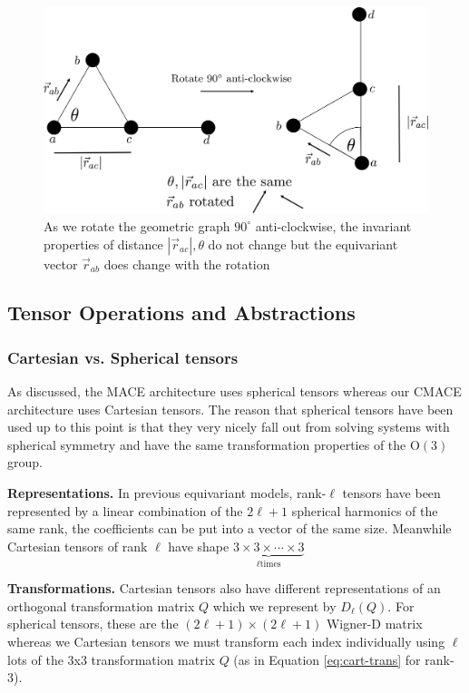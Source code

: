 \begin{figure}[H]
    \centering
    \includegraphics[scale=0.1]{figures/equivariance.png}
    \caption{As we rotate the geometric graph $90^\circ$ anti-clockwise, the invariant properties of distance $|\vec r_{ac}|, \theta$ do not change but the equivariant vector $\vec r_{ab}$ does change with the rotation}
    \label{fig:equivariance}
\end{figure}


\subsection{Tensor Operations and Abstractions}

\subsubsection{Cartesian vs. Spherical tensors} 

As discussed, the MACE architecture uses spherical tensors whereas our CMACE architecture uses Cartesian tensors. The reason that spherical tensors have been used up to this point is that they very nicely fall out from solving systems with spherical symmetry and have the same transformation properties of the $\mathrm O (3)$ group.

\textbf{Representations. } In previous equivariant models, rank-$\ell$ tensors have been represented by a linear combination of the $2\ell + 1$ spherical harmonics of the same rank, the coefficients can be put into a vector of the same size. Meanwhile Cartesian tensors of rank $\ell$ have shape $\underbrace{3\times 3 \times \cdots \times 3}_{\ell \text{times}}$

\textbf{Transformations. } Cartesian tensors also have different representations of an orthogonal transformation matrix $Q$ which we represent by $D_\ell(Q)$. For spherical tensors, these are the $(2\ell + 1)\times(2\ell+1)$ Wigner-D matrix whereas we Cartesian tensors we must transform each index individually using $\ell$ lots of the 3x3 transformation matrix $Q$ (as in Equation \ref{eq:cart-trans} for rank-3).

